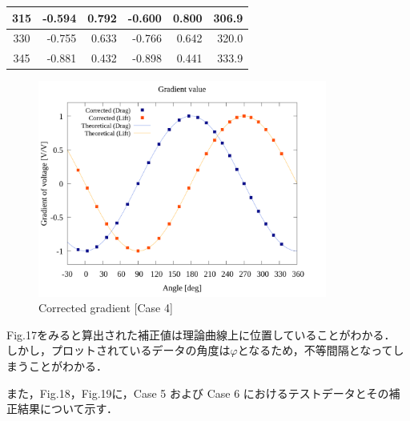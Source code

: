 \begin{table}[htbp]
\begin{center}
\begin{tabular}{|p{15 mm}|p{15 mm}|p{15 mm}|p{15 mm}|p{15 mm}|p{15 mm}|}
      \multicolumn{1}{|c|}{315}                  & \multicolumn{1}{|r|}{-0.594}                                  & \multicolumn{1}{|r|}{0.792}                                   & \multicolumn{1}{|r|}{-0.600}               & \multicolumn{1}{|r|}{0.800}                & \multicolumn{1}{|r|}{306.9}                    \\ \hline
      \multicolumn{1}{|c|}{330}                  & \multicolumn{1}{|r|}{-0.755}                                  & \multicolumn{1}{|r|}{0.633}                                   & \multicolumn{1}{|r|}{-0.766}               & \multicolumn{1}{|r|}{0.642}                & \multicolumn{1}{|r|}{320.0}                    \\ \hline
      \multicolumn{1}{|c|}{345}                  & \multicolumn{1}{|r|}{-0.881}                                  & \multicolumn{1}{|r|}{0.432}                                   & \multicolumn{1}{|r|}{-0.898}               & \multicolumn{1}{|r|}{0.441}                & \multicolumn{1}{|r|}{333.9}                    \\ \hline
    \end{tabular}
  \end{center}
\end{table}

\newpage

\begin{figure}[htbp]
  \begin{center}
    \includegraphics[width=95mm]{../../02_workspace/result/offset_dx=5.0_dy=0.0/plot/21/21-2_summary_offset.png}
    \caption{Corrected gradient [Case 4]}
  \end{center}
\end{figure}


Fig.17をみると算出された補正値は理論曲線上に位置していることがわかる．
しかし，プロットされているデータの角度は$\varphi$となるため，不等間隔となってしまうことがわかる．\par
また，Fig.18，Fig.19に，Case 5 および Case 6 におけるテストデータとその補正結果について示す．

